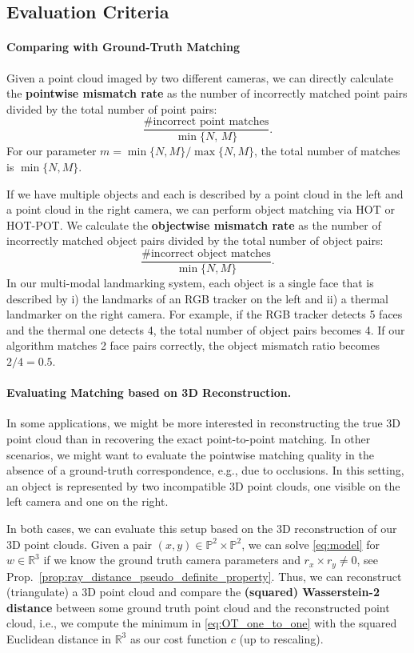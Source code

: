 \documentclass[10pt, twocolumn]{article}
\theoremstyle{definition}
\newcommand{\R}{{\ensuremath{\mathbb{R}}}}
\begin{document}
\subsection{Evaluation Criteria}
\label{sec:matching_rate}
\paragraph*{Comparing with Ground-Truth Matching}
Given a point cloud imaged by two different cameras, we can directly calculate the \textbf{pointwise mismatch rate} as the number of incorrectly matched point pairs divided by the total number of point pairs:
\[
\frac{\#\text{incorrect point matches}}{\min\{N,\,M\}}.
\]
For our parameter $m={\min\{N, M\}}/{\max\{N, M\}}$, the total number of matches is $\min\{N,M\}$.

If we have multiple objects and each is described by a point cloud in the left and a point cloud in the right camera, we can perform object matching via HOT or HOT-POT.
We calculate the \textbf{objectwise mismatch rate} as the number of incorrectly matched object pairs divided by the total number of object pairs:
\[
\frac{\#\text{incorrect object matches}}{\min\{N,M\}}.
\]
In our multi-modal landmarking system, each object is a single face that is described by i) the landmarks of an RGB tracker on the left and ii) a thermal landmarker on the right camera. 
For example, if the RGB tracker detects 5 faces and the thermal one detects 4, the total number of object pairs becomes 4. If our algorithm matches 2 face pairs correctly, the object mismatch ratio becomes $2/4=0.5$.

\paragraph*{Evaluating Matching based on 3D Reconstruction.} \label{sec:unsupervised_eval}
In some applications, we might be more interested in reconstructing the true 3D point cloud than in recovering the exact point-to-point matching. 
In other scenarios, we might want to evaluate the pointwise
matching quality in the absence of a ground-truth correspondence, e.g., due to occlusions.
In this setting, an object is represented by two incompatible 3D point clouds, one visible on the left camera and one on the right. 

In both cases, we can evaluate this setup based on the 3D reconstruction of our 3D point clouds. Given a pair $(x, y) \in \mathbb P^2 \times \mathbb P^2$, 
we can solve \eqref{eq:model} for $w \in \R^3$ if we know the ground truth camera parameters and $r_x \times r_y \neq 0$, see Prop.~\ref{prop:ray_distance_pseudo_definite_property}. 
Thus, we can reconstruct (triangulate) a 3D point cloud and compare the \textbf{(squared) Wasserstein-2 distance} \cite{COTFNT} between some ground truth point cloud and the reconstructed point cloud, i.e., we compute the minimum in  \eqref{eq:OT_one_to_one} with the squared Euclidean distance in $\R^3$ as our cost function $c$ (up to rescaling).
\end{document}
